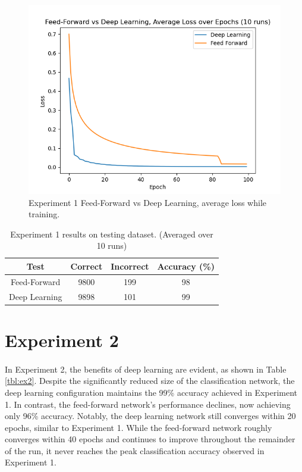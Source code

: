 \begin{center}
	\begin{figure}[H]
		\centering
		\includegraphics[width=\textwidth]{screenshot001}
		\caption{Experiment 1 Feed-Forward vs Deep Learning, average loss while training.}
		\label{fig:ex1loss}
	\end{figure}
\end{center}

\begin{table}[H]
	\centering
	\begin{tabular}{|c|c|c|c|}
		\hline
		Test & Correct & Incorrect & Accuracy (\%) \\
		\hline
		Feed-Forward & 9800 & 199 & 98\\
		\hline
		Deep Learning & 9898 & 101 & 99\\
		\hline
	\end{tabular}
	\caption{Experiment 1 results on testing dataset. (Averaged over 10 runs)}
	\label{tbl:ex1}
\end{table}

\section{Experiment 2}
\paragraph{}
In Experiment 2, the benefits of deep learning are evident, as shown in Table \ref{tbl:ex2}. Despite the significantly reduced size of the classification network, the deep learning configuration maintains the 99\% accuracy achieved in Experiment 1. In contrast, the feed-forward network's performance declines, now achieving only 96\% accuracy. Notably, the deep learning network still converges within 20 epochs, similar to Experiment 1. While the feed-forward network roughly converges within 40 epochs and continues to improve throughout the remainder of the run, it never reaches the peak classification accuracy observed in Experiment 1.

